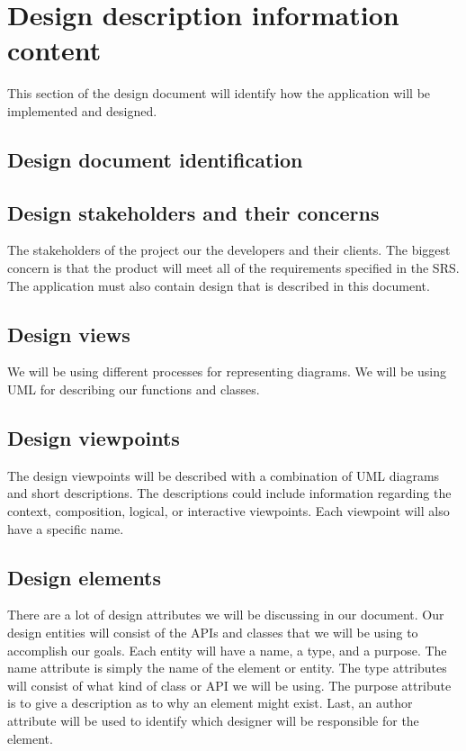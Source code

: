 \documentclass[journal,compsoc, 10pt, draftclsnofoot, onecolumn]{IEEEtran}
\begin{document}
\section{Design description information content}
This section of the design document will identify how the application will be 
implemented and designed. 

\subsection{Design document identification}

\subsection{Design stakeholders and their concerns}
The stakeholders of the project our the developers and their clients. The 
biggest concern is that the product will meet all of the requirements specified 
in the SRS. The application must also contain design that is described in this 
document. 

\subsection{Design views}
We will be using different processes for representing diagrams. We will be using
 UML for describing our functions and classes.

\subsection{Design viewpoints}
The design viewpoints will be described with a combination of UML diagrams and 
short descriptions. The descriptions could include information regarding the 
context, composition, logical, or interactive viewpoints. Each viewpoint will 
also have a specific name.

\subsection{Design elements}
There are a lot of design attributes we will be discussing in our document. Our 
design entities will consist of the APIs and classes that we will be using to 
accomplish our goals. Each entity will have a name, a type, and a purpose. The 
name attribute is simply the name of the element or entity. The type attributes 
will consist of what kind of class or API we will be using. The purpose attribute 
is to give a description as to why an element might exist. Last, an author 
attribute will be used to identify which designer will be responsible for the 
element.
\end{document}
